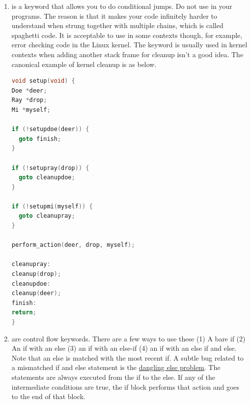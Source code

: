 \begin{enumerate}
\begin{lstlisting}[language=C]
for(int i = 0; i < 10; ++i) {
\end{lstlisting}

	      The order of evaluation for a  loop is as follows.

	      \begin{enumerate}
		      \item Perform the initialization statement.
		      \item Check the invariant. If false, terminate the loop and execute the next statement. If true, continue to the body of the loop.
		      \item Perform the body of the loop.
		      \item Perform the update statement.
		      \item Jump to checking the invariant step.
	      \end{enumerate}

	    \item {} is a keyword that allows you to do conditional jumps.
        Do not use  in your programs.
        The reason is that it makes your code infinitely harder to understand when strung together with multiple chains, which is called spaghetti code.
        It is acceptable to use in some contexts though, for example, error checking code in the Linux kernel.
        The keyword is usually used in kernel contexts when adding another stack frame for cleanup isn't a good idea.
        The canonical example of kernel cleanup is as below.

\begin{lstlisting}[language=C]
void setup(void) {
Doe *deer;
Ray *drop;
Mi *myself;

if (!setupdoe(deer)) {
  goto finish;
}

if (!setupray(drop)) {
  goto cleanupdoe;
}

if (!setupmi(myself)) {
  goto cleanupray;
}

perform_action(deer, drop, myself);

cleanupray:
cleanup(drop);
cleanupdoe:
cleanup(deer);
finish:
return;
}
\end{lstlisting}

	    \item {} are control flow keywords.
        There are a few ways to use these (1) A bare if (2) An if with an else (3) an if with an else-if (4) an if with an else if and else.
        Note that an else is matched with the most recent if.
        A subtle bug related to a mismatched if and else statement is the \href{https://en.wikipedia.org/wiki/Dangling\_else}{dangling else problem}.
        The statements are always executed from the if to the else.
        If any of the intermediate conditions are true, the if block performs that action and goes to the end of that block.


\end{enumerate}
